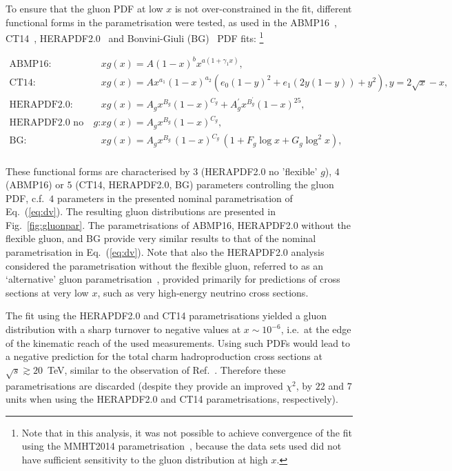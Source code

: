 To ensure that the gluon PDF at low $x$ is not over-constrained in the fit, different functional forms in the parametrisation were tested, as used in the ABMP16~\cite{Alekhin:2017kpj}, CT14~\cite{Dulat:2015mca}, HERAPDF2.0~\cite{Abramowicz:2015mha} and Bonvini-Giuli (BG)~\cite{Bonvini:2019wxf} PDF fits:%
\footnote{Note that in this analysis, it was not possible to achieve convergence of the fit using the MMHT2014 parametrisation~\cite{Harland-Lang:2014zoa}, because the data sets used did not have sufficient sensitivity to the gluon distribution at high $x$.}

\begin{equation}
\begin{aligned}
\textrm{ABMP16:}~~~~~~ &xg(x)=A (1 - x)^b x^{a (1 + \gamma_{1} x)},\\
\textrm{CT14:}~~~~~~ &xg(x) = Ax^{a_1}(1-x)^{a_2}(e_0(1-y)^2+e_1(2y(1-y))+y^2), y=2\sqrt{x}-x,\\
\textrm{HERAPDF2.0:}~~~~~~ &xg(x)=A_gx^{B_g}(1-x)^{C_g}+A^{\prime}_gx^{B^{\prime}_g}(1-x)^{25},\\
\textrm{HERAPDF2.0 no flex. $g$:}~~~~~~ &xg(x)=A_gx^{B_g}(1-x)^{C_g},\\
\textrm{BG:}~~~~~~ &xg(x)=A_{g} x^{B_{g}}\,(1-x)^{C_{g}}\, (1 + F_{g} {\log x} + G_{g} {\log^2 x}),\\
\end{aligned}
\label{eq:gluonpar}
\end{equation}

These functional forms are characterised by $3$ (HERAPDF2.0 no 'flexible' $g$), $4$ (ABMP16) or $5$ (CT14, HERAPDF2.0, BG) parameters controlling the gluon PDF, c.f.\ $4$ parameters in the presented nominal parametrisation of Eq.~(\ref{eq:dv}). 
The resulting gluon distributions are presented in Fig.~\ref{fig:gluonpar}. The parametrisations of ABMP16, HERAPDF2.0 without the flexible gluon, and BG provide very similar results to that of the nominal parametrisation in Eq.~(\ref{eq:dv}). 
Note that also the HERAPDF2.0 analysis considered the parametrisation without the flexible gluon, referred to as an `alternative' gluon parametrisation~\cite{Abramowicz:2015mha}, provided primarily for predictions of cross sections at very low $x$, such as very high-energy neutrino cross sections.

The fit using the HERAPDF2.0 and CT14 parametrisations yielded a gluon distribution with a sharp turnover to negative values at $x \sim 10^{-6}$, i.e.\ at the edge of the kinematic reach of the used measurements. Using such PDFs would lead to a negative prediction for the total charm hadroproduction cross sections at $\sqrt{s} \gtrsim 20$~TeV, similar to the observation of Ref.~\cite{Accardi:2016ndt}. Therefore these parametrisations are discarded (despite they provide an improved $\chi^2$, by $22$ and $7$ units when using the HERAPDF2.0 and CT14 parametrisations, respectively).

